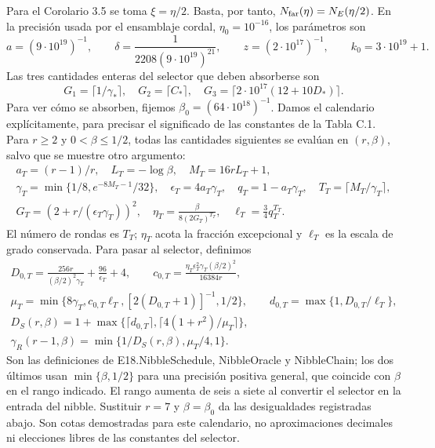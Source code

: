 \documentclass[spanish,11pt,a4paper]{article}
\begin{document}
Para el Corolario 3.5 se toma \(\xi=\eta/2\). Basta, por tanto, \(N_{\rm far}(\eta)=N_E(\eta/2)\). En la precisión usada por el ensamblaje cordal, \(\eta_0=10^{-16}\), los parámetros son \[
a=(9\cdot10^{19})^{-1},\qquad
\delta=\frac1{2208(9\cdot10^{19})^{21}},\qquad
z=(2\cdot10^{17})^{-1},\qquad k_0=3\cdot10^{19}+1.
\] Las tres cantidades enteras del selector que deben absorberse son \[
G_1=\lceil1/\gamma_*\rceil,\quad G_2=\lceil C_*\rceil,\quad
G_3=\lceil2\cdot10^{17}(12+10D_*)\rceil.
\] Para ver cómo se absorben, fijemos \(\beta_0=(64\cdot10^{18})^{-1}\). Damos el calendario explícitamente, para precisar el significado de las constantes de la Tabla C.1. Para \(r\ge2\) y \(0<\beta\le1/2\), todas las cantidades siguientes se evalúan en \((r,\beta)\), salvo que se muestre otro argumento: \[
\begin{gathered}
a_T=(r-1)/r,\quad L_T=-\log\beta,\quad M_T=16rL_T+1,\\
\gamma_T=\min\{1/8,e^{-8M_T-1}/32\},\quad
\epsilon_T=4a_T\gamma_T,\quad q_T=1-a_T\gamma_T,\quad
T_T=\lceil M_T/\gamma_T\rceil,\\
G_T=(2+r/(\epsilon_T\gamma_T))^2,\quad
\eta_T=\frac{\beta}{8(2G_T)^{T_T}},\quad
\ell_T=\frac34q_T^{T_T}.
\end{gathered}
\] El número de rondas es \(T_T\); \(\eta_T\) acota la fracción excepcional y \(\ell_T\) es la escala de grado conservada. Para pasar al selector, definimos \[
\begin{gathered}
D_{0,T}=\frac{256r}{(\beta/2)^2\gamma_T}+\frac{96}{\epsilon_T}+4,\qquad
c_{0,T}=\frac{\eta_T\epsilon_T^2\gamma_T(\beta/2)^2}{16384r},\\
\mu_T=\min\{8\gamma_T,c_{0,T}\ell_T,[2(D_{0,T}+1)]^{-1},1/2\},\qquad
d_{0,T}=\max\{1,D_{0,T}/\ell_T\},\\
D_S(r,\beta)=1+\max\{\lceil d_{0,T}\rceil,\lceil4(1+r^2)/\mu_T\rceil\},\\
\gamma_R(r-1,\beta)=\min\{1/D_S(r,\beta),\mu_T/4,1\}.
\end{gathered}
\] Son las definiciones de {\ttfamily\small E18.\discretionary{\hbox{\ensuremath{\hookrightarrow}}}{}{}NibbleSchedu\discretionary{\hbox{\ensuremath{\hookrightarrow}}}{}{}le}, {\ttfamily\small NibbleOracle} y {\ttfamily\small NibbleChain}; los dos últimos usan \(\min\{\beta,1/2\}\) para una precisión positiva general, que coincide con \(\beta\) en el rango indicado. El rango aumenta de seis a siete al convertir el selector en la entrada del nibble. Sustituir \(r=7\) y \(\beta=\beta_0\) da las desigualdades registradas abajo. Son cotas demostradas para este calendario, no aproximaciones decimales ni elecciones libres de las constantes del selector.
\end{document}

